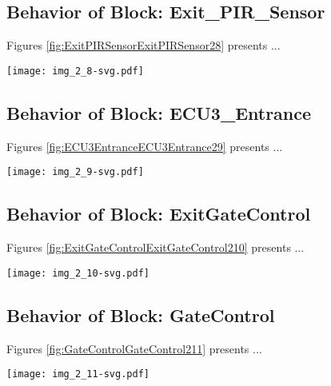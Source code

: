 \subsection{Behavior of Block: Exit\_PIR\_Sensor}
Figures \ref{fig:ExitPIRSensorExitPIRSensor28} presents ...
\begin{figure*}[htb]
\centering
\texttt{[image: img\_2\_8-svg.pdf]}
\caption{Diagram "Behavior of Block: Exit\_PIR\_Sensor"}
\label{fig:ExitPIRSensorExitPIRSensor28}
\end{figure*}

\subsection{Behavior of Block: ECU3\_Entrance}
Figures \ref{fig:ECU3EntranceECU3Entrance29} presents ...
\begin{figure*}[htb]
\centering
\texttt{[image: img\_2\_9-svg.pdf]}
\caption{Diagram "Behavior of Block: ECU3\_Entrance"}
\label{fig:ECU3EntranceECU3Entrance29}
\end{figure*}

\subsection{Behavior of Block: ExitGateControl}
Figures \ref{fig:ExitGateControlExitGateControl210} presents ...
\begin{figure*}[htb]
\centering
\texttt{[image: img\_2\_10-svg.pdf]}
\caption{Diagram "Behavior of Block: ExitGateControl"}
\label{fig:ExitGateControlExitGateControl210}
\end{figure*}

\subsection{Behavior of Block: GateControl}
Figures \ref{fig:GateControlGateControl211} presents ...
\begin{figure*}[htb]
\centering
\texttt{[image: img\_2\_11-svg.pdf]}
\caption{Diagram "Behavior of Block: GateControl"}
\label{fig:GateControlGateControl211}
\end{figure*}

